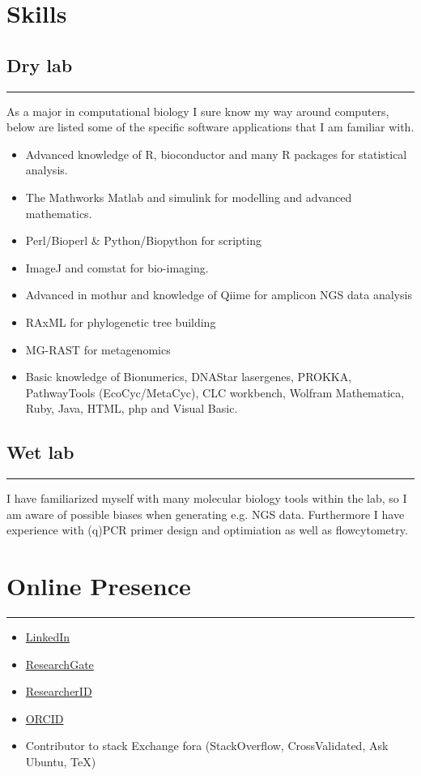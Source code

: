\documentclass[a4paper,11pt,oneside]{article}
\begin{document}
\section*{Skills}
\subsection*{Dry lab}
\rule{\textwidth}{1pt}
As a major in computational biology I sure know my way around computers, below are listed some of the specific software applications that I am familiar with.
\begin{itemize}
	\item Advanced knowledge of R, bioconductor and many R packages for statistical analysis.
	\item The Mathworks Matlab and simulink for modelling and advanced mathematics.
	\item Perl/Bioperl \& Python/Biopython for scripting
	\item ImageJ and comstat for bio-imaging.
  \item Advanced in mothur and knowledge of Qiime for amplicon NGS data analysis
  \item RAxML for phylogenetic tree building
  \item MG-RAST for metagenomics
	\item Basic knowledge of Bionumerics, DNAStar lasergenes, PROKKA, PathwayTools (EcoCyc/MetaCyc), CLC workbench, Wolfram Mathematica,  Ruby, Java, HTML, php and Visual Basic.
\end{itemize}
\subsection*{Wet lab}
\rule{\textwidth}{1pt}
I have familiarized myself with many molecular biology tools within the lab, so 
I am aware of possible biases when generating e.g. NGS data. Furthermore I have experience with (q)PCR primer design 
and optimiation as well as flowcytometry.

\section*{Online Presence}
\rule{\textwidth}{1pt}
\begin{itemize}
  \item \href{https://www.linkedin.com/pub/frederiek-maarten-kerckhof/26/b47/668}{LinkedIn}
  \item \href{https://www.researchgate.net/profile/Frederiek-Maarten_Kerckhof}{ResearchGate}
  \item \href{http://www.researcherid.com/ProfileView.action?SID=V2bGbhtEe1TlsfIEXBz&returnCode=ROUTER.Success&queryString=KG0UuZjN5WlUD2sX8KoC12Tw17vPT2A6ocQ5tgzRDDI\%253D\&SrcApp=CR\&Init=Yes}{ResearcherID}
  \item \href{http://orcid.org/0000-0002-4472-6810}{ORCID}
  \item Contributor to stack Exchange fora (StackOverflow, CrossValidated, Ask Ubuntu, TeX)
\end{itemize}

\newpage
\renewcommand{\refname}{Academic publications and conference proceedings} %
\renewcommand{\bibname}{Academic publications and conference proceedings} %
\nocite{*}


%
\end{document}
